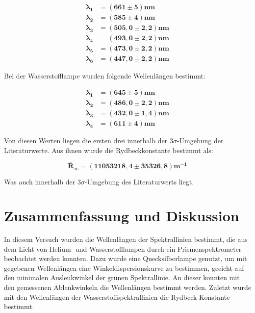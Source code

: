 \documentclass{article}
\begin{document}
\begin{equation}
    \begin{split}
        \bm{\lambda_1} &= \bm{(661 \pm 5) \text{nm}} \\
        \bm{\lambda_2} &= \bm{(585 \pm 4) \text{nm}} \\
        \bm{\lambda_3} &= \bm{(505,0 \pm 2,2) \text{nm}} \\
        \bm{\lambda_4} &= \bm{(493,0 \pm 2,2) \text{nm}} \\
        \bm{\lambda_5} &= \bm{(473,0 \pm 2,2) \text{nm}} \\
        \bm{\lambda_6} &= \bm{(447,0 \pm 2,2) \text{nm}}
    \end{split} 
\end{equation}

Bei der Wasserstofflampe wurden folgende Wellenlängen bestimmt:

\begin{equation}
    \begin{split}
        \bm{\lambda_1} &= \bm{(645 \pm 5) \text{nm}} \\
        \bm{\lambda_2} &= \bm{(486,0 \pm 2,2) \text{nm}} \\
        \bm{\lambda_3} &= \bm{(432,0 \pm 1,4) \text{nm}} \\
        \bm{\lambda_4} &= \bm{(611 \pm 4) \text{nm}}
    \end{split} 
\end{equation}

Von diesen Werten liegen die ersten drei innerhalb der $3\sigma$-Umgebung der Literaturwerte. Aus ihnen wurde die Rydbeckkonstante bestimmt als:

\begin{equation}
    \bm{\overline{R}_{\infty}} = \bm{(11053218,4 \pm 35326,8) m^{-1}}
\end{equation}

Was auch innerhalb der $3\sigma$-Umgebung des Literaturwerts liegt.

\newpage

\section{Zusammenfassung und Diskussion}

In diesem Versuch wurden die Wellenlängen der Spektrallinien bestimmt, die aus dem Licht von Helium- und Wasserstofflampen durch ein Prismenspektrometer beobachtet werden konnten. Dazu wurde eine Quecksilberlampe genutzt, um mit gegebenen Wellenlängen eine Winkeldispersionskurve zu bestimmen, geeicht auf den minimalen Auslenkwinkel der grünen Spektrallinie. An dieser konnten mit den gemessenen Ablenkwinkeln die Wellenlängen bestimmt werden. Zuletzt wurde mit den Wellenlängen der Wasserstoffspektrallinien die Rydbeck-Konstante bestimmt.
\end{document}

